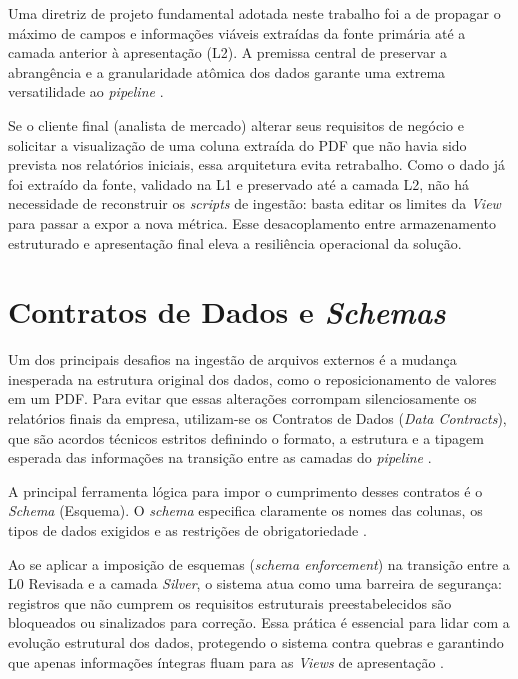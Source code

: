 Uma diretriz de projeto fundamental adotada neste trabalho foi a de propagar o máximo de campos e informações viáveis extraídas da fonte primária até a camada anterior à apresentação (L2). A premissa central de preservar a abrangência e a granularidade atômica dos dados garante uma extrema versatilidade ao \textit{pipeline} \cite{kimball13}. 

Se o cliente final (analista de mercado) alterar seus requisitos de negócio e solicitar a visualização de uma coluna extraída do PDF que não havia sido prevista nos relatórios iniciais, essa arquitetura evita retrabalho. Como o dado já foi extraído da fonte, validado na L1 e preservado até a camada L2, não há necessidade de reconstruir os \textit{scripts} de ingestão: basta editar os limites da \textit{View} para passar a expor a nova métrica. Esse desacoplamento entre armazenamento estruturado e apresentação final eleva a resiliência operacional da solução.

\section{Contratos de Dados e \textit{Schemas}}

Um dos principais desafios na ingestão de arquivos externos é a mudança inesperada na estrutura original dos dados, como o reposicionamento de valores em um PDF. Para evitar que essas alterações corrompam silenciosamente os relatórios finais da empresa, utilizam-se os Contratos de Dados (\textit{Data Contracts}), que são acordos técnicos estritos definindo o formato, a estrutura e a tipagem esperada das informações na transição entre as camadas do \textit{pipeline} \cite{kleppmann17, armbrust20}.

A principal ferramenta lógica para impor o cumprimento desses contratos é o \textit{Schema} (Esquema). O \textit{schema} especifica claramente os nomes das colunas, os tipos de dados exigidos e as restrições de obrigatoriedade \cite{liao20}. 

Ao se aplicar a imposição de esquemas (\textit{schema enforcement}) na transição entre a L0 Revisada e a camada \textit{Silver}, o sistema atua como uma barreira de segurança: registros que não cumprem os requisitos estruturais preestabelecidos são bloqueados ou sinalizados para correção. Essa prática é essencial para lidar com a evolução estrutural dos dados, protegendo o sistema contra quebras e garantindo que apenas informações íntegras fluam para as \textit{Views} de apresentação \cite{armbrust20}.

